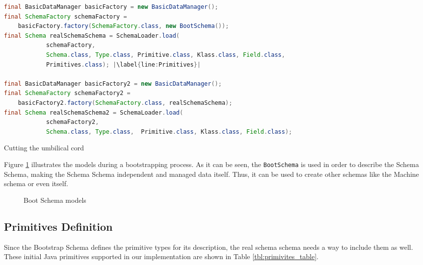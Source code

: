 \begin{sourcecode} [H]
	\begin{lstlisting}[language=Java, escapechar=|]
final BasicDataManager basicFactory = new BasicDataManager();
final SchemaFactory schemaFactory = 
	basicFactory.factory(SchemaFactory.class, new BootSchema());
final Schema realSchemaSchema = SchemaLoader.load(
        	schemaFactory,
         	Schema.class, Type.class, Primitive.class, Klass.class, Field.class,
        	Primitives.class); |\label{line:Primitives}|

final BasicDataManager basicFactory2 = new BasicDataManager();
final SchemaFactory schemaFactory2 = 
	basicFactory2.factory(SchemaFactory.class, realSchemaSchema);
final Schema realSchemaSchema2 = SchemaLoader.load(
        	schemaFactory2, 
        	Schema.class, Type.class,  Primitive.class, Klass.class, Field.class);
	\end{lstlisting}
	\caption{Cutting the umbilical cord}
	\label{lst:Cutting the umbilical cord}
\end{sourcecode}

Figure \ref{fig:schema_schema_models} illustrates the models during a bootstrapping process.
As it can be seen, the \texttt{BootSchema} is used in order to describe the Schema Schema, making the Schema Schema independent and managed data itself.
Thus, it can be used to create other schemas like the Machine schema or even itself.

\begin{figure}[H]
	\centering
  	\caption{Boot Schema models}
  	\label{fig:schema_schema_models}
\end{figure}

\subsection{Primitives Definition}\label{Primitives Definition}
Since the Bootstrap Schema defines the primitive types for its description, the real schema schema needs a way to include them as well.
These initial Java primitives supported in our implementation are shown in Table \ref{tbl:primivites_table}.

